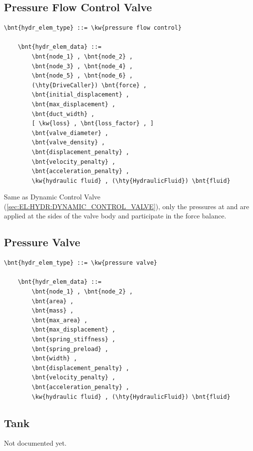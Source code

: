 \subsection{Pressure Flow Control Valve}
\label{sec:EL:HYDR:PRESSURE_FLOW_CONTROL_VALVE}
\begin{Verbatim}[commandchars=\\\{\}]
    \bnt{hydr_elem_type} ::= \kw{pressure flow control}

    \bnt{hydr_elem_data} ::=
        \bnt{node_1} , \bnt{node_2} ,
        \bnt{node_3} , \bnt{node_4} ,
        \bnt{node_5} , \bnt{node_6} ,
        (\hty{DriveCaller}) \bnt{force} ,
        \bnt{initial_displacement} ,
        \bnt{max_displacement} ,
        \bnt{duct_width} ,
        [ \kw{loss} , \bnt{loss_factor} , ]
        \bnt{valve_diameter} ,
        \bnt{valve_density} ,
        \bnt{displacement_penalty} ,
        \bnt{velocity_penalty} ,
        \bnt{acceleration_penalty} ,
        \kw{hydraulic fluid} , (\hty{HydraulicFluid}) \bnt{fluid}
\end{Verbatim}
Same as Dynamic Control Valve (\ref{sec:EL:HYDR:DYNAMIC_CONTROL_VALVE}),
only the pressures at  and  are applied
at the sides of the valve body and participate in the force balance.



\subsection{Pressure Valve}
\label{sec:EL:HYDR:PRESSURE_VALVE}
\begin{Verbatim}[commandchars=\\\{\}]
    \bnt{hydr_elem_type} ::= \kw{pressure valve}

    \bnt{hydr_elem_data} ::=
        \bnt{node_1} , \bnt{node_2} ,
        \bnt{area} ,
        \bnt{mass} ,
        \bnt{max_area} ,
        \bnt{max_displacement} ,
        \bnt{spring_stiffness} ,
        \bnt{spring_preload} ,
        \bnt{width} ,
        \bnt{displacement_penalty} ,
        \bnt{velocity_penalty} ,
        \bnt{acceleration_penalty} ,
        \kw{hydraulic fluid} , (\hty{HydraulicFluid}) \bnt{fluid}
\end{Verbatim}



\subsection{Tank}
\label{sec:EL:HYDR:TANK}
Not documented yet.



